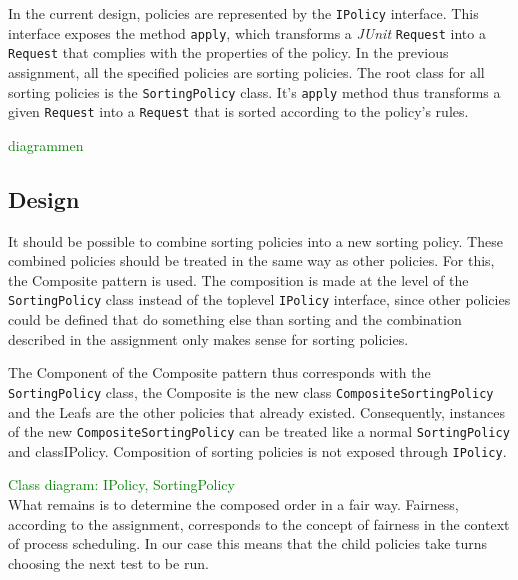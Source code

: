 \documentclass[i3]{oss}
\newcommand{\class}[1]{\texttt{#1}}
\newcommand{\method}[1]{\texttt{#1}}
\newcommand{\junit}{\emph{JUnit }}
\newcommand{\comment}[1]{{\huge \textcolor{green}{#1}}\\}
\begin{document}
In the current design, policies are represented by the \class{IPolicy} interface.
This interface exposes the method \method{apply}, which transforms a \junit \class{Request} into a \class{Request} that complies with the properties of the policy.
In the previous assignment, all the specified policies are sorting policies.
The root class for all sorting policies is the \class{SortingPolicy} class. It's \method{apply} method thus transforms a given \class{Request} into a \class{Request} that is sorted according to the policy's rules.

\comment{diagrammen}

\subsection{Design}
\label{ss:designext}

It should be possible to combine sorting policies into a new sorting policy.
These combined policies should be treated in the same way as other policies.
For this, the Composite pattern is used.
The composition is made at the level of the \class{SortingPolicy} class instead of the toplevel \class{IPolicy} interface, since other policies could be defined that do something else than sorting and the combination described in the assignment only makes sense for sorting policies.

The Component of the Composite pattern thus corresponds with the \class{SortingPolicy} class, the Composite is the new class \class{CompositeSortingPolicy} and the Leafs are the other policies that already existed. 
Consequently, instances of the new \class{CompositeSortingPolicy} can be treated like a normal \class{SortingPolicy} and class{IPolicy}.
Composition of sorting policies is not exposed through \class{IPolicy}.

\comment{Class diagram: IPolicy, SortingPolicy}

What remains is to determine the composed order in a fair way.
Fairness, according to the assignment, corresponds to the concept of fairness in the context of process scheduling.
In our case this means that the child policies take turns choosing the next test to be run.



\end{document}
